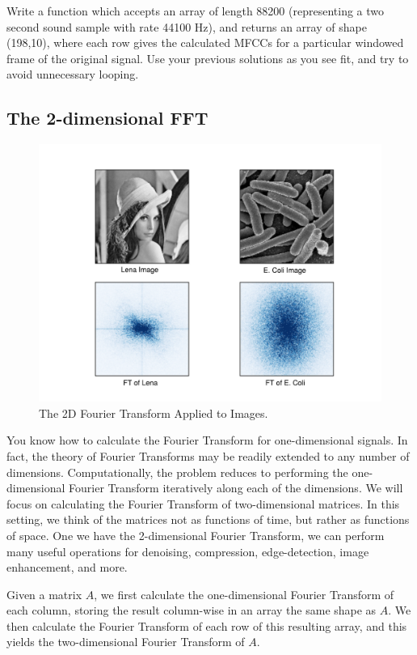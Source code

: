 \begin{problem}
Write a function  which accepts an array of length 88200 (representing a two second sound sample
with rate 44100 Hz), and returns an array of shape (198,10), where each row gives the calculated MFCCs for
a particular windowed frame of the original signal. Use your previous solutions as you see fit, and try to
avoid unnecessary looping.
\end{problem}

\subsection*{The 2-dimensional FFT}
\begin{figure}
\centering
\includegraphics[width=\textwidth]{2dfft.pdf}
\caption{The 2D Fourier Transform Applied to Images.}
\label{fourierext:2dfft}
\end{figure}
You know how to calculate the Fourier Transform for one-dimensional signals. In fact, the theory of
Fourier Transforms may be readily extended to any number of dimensions.
Computationally, the problem reduces to performing the one-dimensional Fourier Transform iteratively
along each of the dimensions. We will focus on calculating the Fourier Transform of two-dimensional
matrices. In this setting, we think of the matrices not as functions of time, but rather as functions of
space. One we have the 2-dimensional Fourier Transform, we can perform many useful operations for
denoising, compression, edge-detection, image enhancement, and more.

Given a matrix $A$, we first calculate the one-dimensional Fourier Transform of each column, storing the
result column-wise in an array the same shape as $A$. We then calculate the Fourier Transform of each
row of this resulting array, and this yields the two-dimensional Fourier Transform of $A$.

